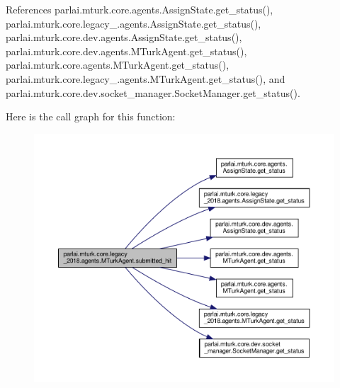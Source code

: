 References parlai.\+mturk.\+core.\+agents.\+Assign\+State.\+get\+\_\+status(), parlai.\+mturk.\+core.\+legacy\+\_.\+agents.\+Assign\+State.\+get\+\_\+status(), parlai.\+mturk.\+core.\+dev.\+agents.\+Assign\+State.\+get\+\_\+status(), parlai.\+mturk.\+core.\+dev.\+agents.\+M\+Turk\+Agent.\+get\+\_\+status(), parlai.\+mturk.\+core.\+agents.\+M\+Turk\+Agent.\+get\+\_\+status(), parlai.\+mturk.\+core.\+legacy\+\_.\+agents.\+M\+Turk\+Agent.\+get\+\_\+status(), and parlai.\+mturk.\+core.\+dev.\+socket\+\_\+manager.\+Socket\+Manager.\+get\+\_\+status().

Here is the call graph for this function\+:
\nopagebreak
\begin{figure}[H]
\begin{center}
\leavevmode
\includegraphics[width=350pt]{classparlai_1_1mturk_1_1core_1_1legacy__2018_1_1agents_1_1MTurkAgent_a8f1e6f940081eab5ce329b106c61b294_cgraph}
\end{center}
\end{figure}
\mbox{\label{classparlai_1_1mturk_1_1core_1_1legacy__2018_1_1agents_1_1MTurkAgent_a72ce27a25ace6cceda8d01bf6bf9f294}} 
